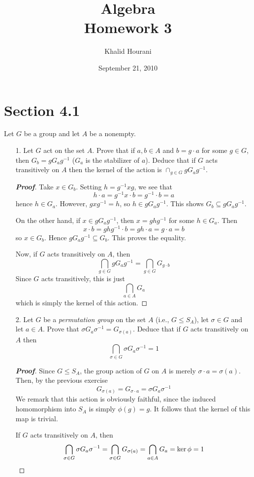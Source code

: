 \documentclass[12pt,leqno]{book}
\title{Algebra\\\large Homework 3}
\date{September 21, 2010}
\author{Khalid Hourani}
\theoremstyle{definition}
\newenvironment{Proof}{\begin{proof}[\textnormal{\textbf{Proof}}]}{\end{proof}}
\begin{document}
 \begin{titlepage}
  \maketitle
 \end{titlepage}
\section*{Section 4.1}
Let $G$ be a group and let $A$ be a nonempty.
\begin{enumerate}
 \item [1.] Let $G$ act on the set $A$. Prove that if $a,b\in A$ and $b=g\cdot a$ for some $g\in G$, then $G_b=gG_ag^{-1}$ ($G_a$ is the stabilizer of $a$). Deduce that if $G$ acts transitively on $A$ then the kernel of the action is $\cap_{g\in G}gG_ag^{-1}$.
\begin{Proof}
 Take $x\in G_b$. Setting $h=g^{-1}xg$, we see that \[h\cdot a=g^{-1}x\cdot b=g^{-1}\cdot b=a\] hence $h\in G_a$. However, $gxg^{-1}=h$, so $h\in gG_ag^{-1}$. This shows $G_b\subseteq gG_ag^{-1}$.

On the other hand, if $x\in gG_ag^{-1}$, then $x=ghg^{-1}$ for some $h\in G_a$. Then \[x\cdot b=ghg^{-1}\cdot b=gh\cdot a=g\cdot a=b\] so $x\in G_b$. Hence $gG_ag^{-1}\subseteq G_b$. This proves the equality.

Now, if $G$ acts transitively on $A$, then \[\bigcap_{g\in G}gG_ag^{-1}=\bigcap_{g\in G}G_{g\cdot b}\] Since $G$ acts transitively, this is just \[\bigcap_{a\in A}G_a\] which is simply the kernel of this action. 
\end{Proof}

 \item [2.] Let $G$ be a \textit{permutation group} on the set $A$ (i.e., $G\leq S_A$), let $\sigma\in G$ and let $a\in A$. Prove that $\sigma G_a\sigma^{-1}=G_{\sigma(a)}$. Deduce that if $G$ acts transitively on $A$ then \[\bigcap_{\sigma\in G}\sigma G_a\sigma^{-1}=1\]

\begin{Proof}
 Since $G\leq S_A$, the group action of $G$ on $A$ is merely $\sigma\cdot a=\sigma(a)$. Then, by the previous exercise \[G_{\sigma(a)}=G_{\sigma\cdot a}=\sigma G_a\sigma^{-1}\] We remark that this action is obviously faithful, since the induced homomorphism into $S_A$ is simply $\phi(g)=g$. It follows that the kernel of this map is trivial.

If $G$ acts transitively on $A$, then \[\bigcap_{\sigma\in G}\sigma G_a\sigma^{-1}=\bigcap_{\sigma\in G}G_{\sigma(a)}=\bigcap_{a\in A}G_a=\ker\phi=1\qedhere\]
\end{Proof}


\end{enumerate}
\end{document}
